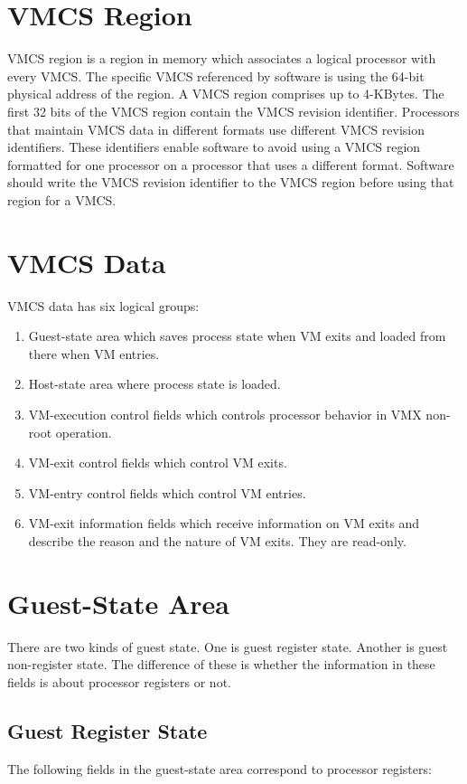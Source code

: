 \documentclass[10pt,draftclsnofoot,journal,compsoc,onecolumn]{IEEEtran}
\begin{document}
	\section{VMCS Region}
	VMCS region is a region in memory which associates a logical processor with every VMCS. The specific VMCS referenced by software is using the 64-bit physical address of the region. \cite{2}A VMCS region comprises up to 4-KBytes. The first 32 bits of the VMCS region contain the VMCS revision identifier. Processors that maintain VMCS data in different formats use different VMCS revision identifiers. These identifiers enable software to avoid using a VMCS
	region formatted for one processor on a processor that uses a different format. Software should write the VMCS revision identifier to the VMCS region before using that region for a VMCS.
	
	\section{VMCS Data}
	VMCS data has six logical groups:
	
	\begin{enumerate}
		\item Guest-state area which saves process state when VM exits and loaded from there when VM entries.
		\item Host-state area where process state is loaded.
		\item VM-execution control fields which controls processor behavior in VMX non-root operation.
		\item VM-exit control fields which control VM exits.
		\item VM-entry control fields which control VM entries.
		\item VM-exit information fields which receive information on VM exits and describe the reason and the nature of VM exits. They are read-only.
	\end{enumerate}
	
	\section{Guest-State Area}
	There are two kinds of guest state. One is guest register state. Another is guest non-register state. The difference of these is whether the information in these fields is about processor registers or not.
	
	\subsection{Guest Register State}
	The following fields in the guest-state area correspond to processor registers:
	
\end{document}
